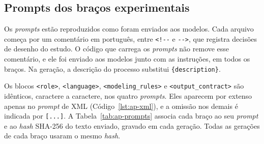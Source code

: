 \begin{apendicesenv}
\partapendices


\chapter{Prompts dos braços experimentais}\label{ap:prompts-bracos}

Os \textit{prompts} estão reproduzidos como foram enviados aos modelos. Cada arquivo começa por um comentário em português, entre \verb|<!--| e \verb|-->|, que registra decisões de desenho do estudo. O código que carrega os \textit{prompts} não remove esse comentário, e ele foi enviado aos modelos junto com as instruções, em todos os braços. Na geração, a descrição do processo substitui \texttt{\{description\}}.

Os blocos \texttt{<role>}, \texttt{<language>}, \texttt{<modeling\_rules>} e \texttt{<output\_contract>} são idênticos, caractere a caractere, nos quatro \textit{prompts}. Eles aparecem por extenso apenas no \textit{prompt} de XML (Código~\ref{lst:ap-xml}), e a omissão nos demais é indicada por \texttt{[...]}. A Tabela~\ref{tab:ap-prompts} associa cada braço ao seu \textit{prompt} e ao \textit{hash} SHA-256 do texto enviado, gravado em cada geração. Todas as gerações de cada braço usaram o mesmo \textit{hash}.

\begin{table}[htb]
\end{table}


\end{apendicesenv}
